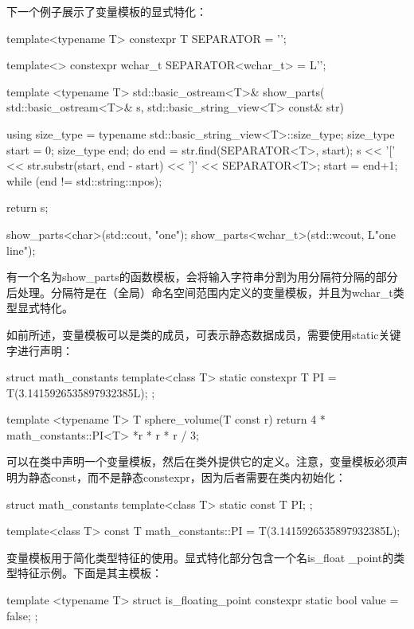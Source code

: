 下一个例子展示了变量模板的显式特化：

\begin{cppcode}
template<typename T>
constexpr T SEPARATOR = '\n';

template<>
constexpr wchar_t SEPARATOR<wchar_t> = L'\n';

template <typename T>
std::basic_ostream<T>& show_parts(
	std::basic_ostream<T>& s,
	std::basic_string_view<T> const& str)
{
	using size_type =
		typename std::basic_string_view<T>::size_type;
	size_type start = 0;
	size_type end;
	do
	{
		end = str.find(SEPARATOR<T>, start);
		s << '[' << str.substr(start, end - start) << ']'
		<< SEPARATOR<T>;
		start = end+1;
	} while (end != std::string::npos);

	return s;
}

show_parts<char>(std::cout, "one\ntwo\nthree");
show_parts<wchar_t>(std::wcout, L"one line");
\end{cppcode}

有一个名为show_parts的函数模板，会将输入字符串分割为用分隔符分隔的部分后处理。分隔符是在（全局）命名空间范围内定义的变量模板，并且为wchar_t类型显式特化。

如前所述，变量模板可以是类的成员，可表示静态数据成员，需要使用static关键字进行声明：

\begin{cppcode}
struct math_constants
{
	template<class T>
	static constexpr T PI = T(3.1415926535897932385L);
};

template <typename T>
T sphere_volume(T const r)
{
	return 4 * math_constants::PI<T> *r * r * r / 3;
}
\end{cppcode}

可以在类中声明一个变量模板，然后在类外提供它的定义。注意，变量模板必须声明为静态const，而不是静态constexpr，因为后者需要在类内初始化：

\begin{cppcode}
struct math_constants
{
	template<class T>
	static const T PI;
};

template<class T>
const T math_constants::PI = T(3.1415926535897932385L);
\end{cppcode}

变量模板用于简化类型特征的使用。显式特化部分包含一个名is_float _point的类型特征示例。下面是其主模板：

\begin{cppcode}
template <typename T>
struct is_floating_point
{
	constexpr static bool value = false;
};
\end{cppcode}

